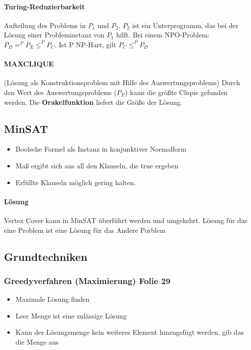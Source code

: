 \documentclass[ngerman]{scrartcl}
\begin{document}
\paragraph{Turing-Reduzierbarkeit} Aufteilung des Problems in $ P_1 $ und $ P_2 $. $ P_2 $ ist ein Unterprogramm, das bei der Lösung einer Probleminstanz von $ P_1 $  hilft.
Bei einem NPO-Problem: $ P_D =^P P_E \leq^P P_C $. Ist P NP-Hart, gilt $ P_C \leq^P P_D $
\paragraph{MAXCLIQUE} (Lösung als Konstruktionsproblem mit Hilfe des Auswertungsproblems) Durch den Wert des Auswertungsproblems ($ P_E $) kann die größte Clique gefunden werden. Die \textbf{Orakelfunktion} liefert die Größe der Lösung.  

\subsection*{MinSAT}
\begin{itemize}
  \item Boolsche Formel als Instanz in konjunktiver Normalform
  \item Maß ergibt sich aus all den Klauseln, die true ergeben
  \item Erfüllte Klauseln möglich gering halten. 
\end{itemize}
\paragraph{Lösung} Vertex Cover kann in MinSAT überführt werden und umgekehrt. Lösung für das eine Problem ist eine Lösung für das Andere Porblem

\subsection{Grundtechniken}
\subsubsection{Greedyverfahren (Maximierung) Folie 29}
\begin{itemize}
  \item Maximale Lösung finden
  \item Leer Menge ist eine zulässige Lösung
  \item Kann der Lösungsmenge kein weiteres Element hinzugefügt werden, gib das die Menge aus
\end{itemize}
\end{document}
